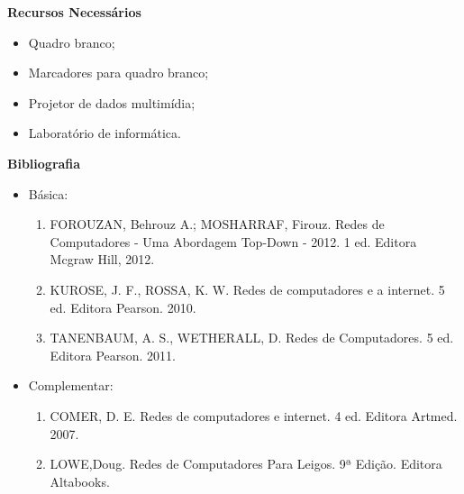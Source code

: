\begin{snugshade}\begin{center}\textbf{
    Recursos Necessários
    \vphantom{q} %
}\end{center}\end{snugshade}

\begin{itemize} 
	\item Quadro branco;
	\item Marcadores para quadro branco;
	\item Projetor de dados multimídia;
	\item Laboratório de informática.
\end{itemize}


\begin{snugshade}\begin{center}\textbf{
    Bibliografia
}\end{center}\end{snugshade}

\begin{itemize} 
  \item Básica:
	\begin{enumerate}
	\item FOROUZAN, Behrouz A.; MOSHARRAF, Firouz. Redes de Computadores - Uma Abordagem Top-Down - 2012. 1 ed. Editora Mcgraw Hill, 2012.
	\item KUROSE, J. F., ROSSA, K. W. Redes de computadores e a internet. 5 ed. Editora Pearson. 2010.
	\item TANENBAUM, A. S., WETHERALL, D. Redes de Computadores. 5 ed. Editora Pearson. 2011. 
	\end{enumerate}
  \item Complementar:
	\begin{enumerate} 
	\item COMER, D. E. Redes de computadores e internet. 4 ed. Editora Artmed. 2007.
	\item LOWE,Doug. Redes de Computadores Para Leigos. 9ª Edição. Editora Altabooks.
	\end{enumerate}
\end{itemize}
